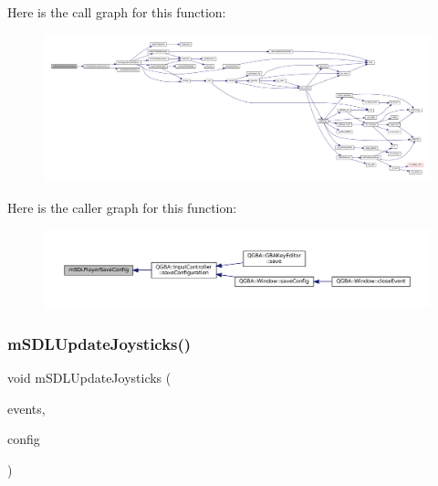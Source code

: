 Here is the call graph for this function\+:
\nopagebreak
\begin{figure}[H]
\begin{center}
\leavevmode
\includegraphics[width=350pt]{sdl-events_8c_a337054256f6cb4160128bdfe03bfe3e1_cgraph}
\end{center}
\end{figure}
Here is the caller graph for this function\+:
\nopagebreak
\begin{figure}[H]
\begin{center}
\leavevmode
\includegraphics[width=350pt]{sdl-events_8c_a337054256f6cb4160128bdfe03bfe3e1_icgraph}
\end{center}
\end{figure}
\mbox{\label{sdl-events_8c_aff18d01c9bc92cc366bd2dd53984420a}} 
\subsubsection{\texorpdfstring{m\+S\+D\+L\+Update\+Joysticks()}{mSDLUpdateJoysticks()}}
{\footnotesize\ttfamily void m\+S\+D\+L\+Update\+Joysticks (\begin{DoxyParamCaption}\item[{struct \mbox{\hyperlink{sdl-events_8h_structm_s_d_l_events}{m\+S\+D\+L\+Events}} $\ast$}]{events,  }\item[{const struct Configuration $\ast$}]{config }\end{DoxyParamCaption})}

